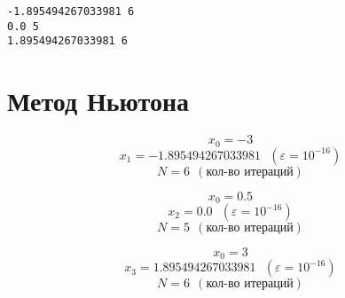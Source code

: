 \documentclass[11pt]{article}
\begin{document}
    \begin{Verbatim}[commandchars=\\\{\}]
-1.895494267033981 6
0.0 5
1.895494267033981 6
    \end{Verbatim}

    \hypertarget{ux43cux435ux442ux43eux434-ux43dux44cux44eux442ux43eux43dux430}{%
\section{Метод
Ньютона}\label{ux43cux435ux442ux43eux434-ux43dux44cux44eux442ux43eux43dux430}}

\[
x_{0} = -3
\] \[
x_{1} = -1.895494267033981 \ \ \ (\varepsilon = 10^{-16})
\] \[
N = 6 \ \ (\text{кол-во итераций})
\]

\[
x_{0} = 0.5
\] \[
x_{2} = 0.0 \ \ \ (\varepsilon = 10^{-16})
\] \[
N = 5 \ \ (\text{кол-во итераций})
\]

\[
x_{0} = 3
\] \[
x_{3} = 1.895494267033981 \ \ \ (\varepsilon = 10^{-16})
\] \[
N = 6 \ \ (\text{кол-во итераций})
\]
\end{document}

